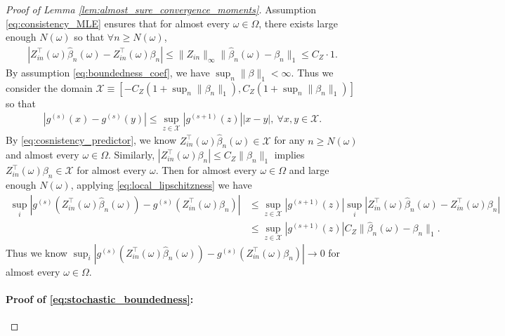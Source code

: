 \documentclass[12pt]{article}
\theoremstyle{definition}
\newcommand{\srz}{Z}									%
\begin{document}
\begin{proof}[Proof of Lemma \ref{lem:almost_sure_convergence_moments}]
  Assumption \eqref{eq:consistency_MLE} ensures that for almost every $\omega\in\Omega$, there exists large enough $N(\omega)$ so that $\forall n\geq N(\omega)$,
  \begin{align}\label{eq:cosnistency_predictor}
    |\srz_{in}^\top (\omega) \widehat{\beta}_n(\omega)-\srz_{in}^\top(\omega)\beta_n|\leq \|\srz_{in}\|_\infty\|\widehat{\beta}_n(\omega)-\beta_n\|_1\leq C_Z\cdot 1.
  \end{align}
  By assumption \eqref{eq:boundedness_coef}, we have $\sup_n\|\beta\|_1<\infty$. Thus we consider the domain $\mathcal{X}\equiv [-C_Z(1+\sup_n\|\beta_n\|_1),C_Z(1+\sup_n\|\beta_n\|_1)]$ so that 
  \begin{align}\label{eq:local_lipschitzness}
    |g^{(s)}(x)-g^{(s)}(y)|\leq \sup_{z\in\mathcal{X}}|g^{(s+1)}(z)||x-y|,\ \forall x,y\in \mathcal{X}.
  \end{align}
  By \eqref{eq:cosnistency_predictor}, we know $\srz_{in}^\top(\omega) \widehat{\beta}_n(\omega)\in\mathcal{X}$ for any $n\geq N(\omega)$ and almost every $\omega\in\Omega$. Similarly, $|\srz_{in}^\top(\omega)\beta_n|\leq C_Z\|\beta_n\|_1$ implies $\srz_{in}^\top(\omega) \beta_n\in\mathcal{X}$ for almost every $\omega$. Then for almost every $\omega\in\Omega$ and large enough $N(\omega)$, applying \eqref{eq:local_lipschitzness} we have
  \begin{align*}
    \sup_{i}|g^{(s)}(\srz_{in}^\top(\omega) \widehat\beta_n(\omega))-g^{(s)}(\srz_{in}^\top (\omega)\beta_n)|
    &
    \leq \sup_{z\in\mathcal{X}}|g^{(s+1)}(z)|\sup_{i}|\srz_{in}^\top (\omega)\widehat{\beta}_n(\omega)-\srz_{in}^\top(\omega)\beta_n|\\
    &
    \leq \sup_{z\in\mathcal{X}}|g^{(s+1)}(z)|C_Z\|\widehat{\beta}_n(\omega)-\beta_n\|_1.
  \end{align*}
  Thus we know $\sup_i|g^{(s)}(\srz_{in}^\top(\omega) \widehat\beta_n(\omega))-g^{(s)}(\srz_{in}^\top(\omega) \beta_n)|\rightarrow0$ for almost every $\omega\in\Omega$.

\paragraph{Proof of \eqref{eq:stochastic_boundedness}:}


\end{proof}
\end{document}
